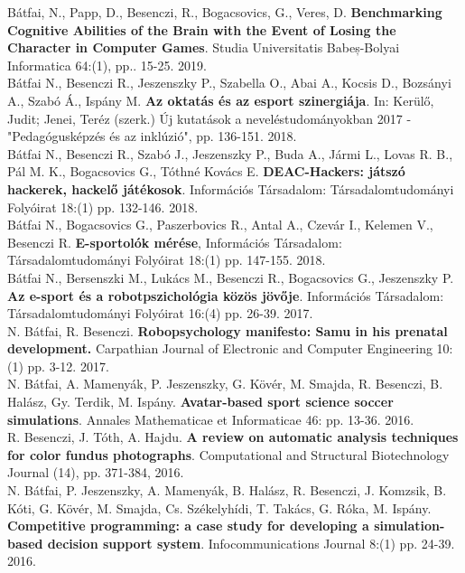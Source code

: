 \documentclass[b5paper,12pt]{report}
\theoremstyle{definition}
\begin{document}
\begin{singlespace}
\noindent
Bátfai, N., Papp, D., Besenczi, R., Bogacsovics, G., Veres, D. {\bf{Benchmarking Cognitive Abilities of the Brain with the Event of Losing the Character in Computer Games}}.
Studia Universitatis Babeș-Bolyai Informatica 64:(1), pp.. 15-25. 2019.
\\[10pt]
\noindent
Bátfai N., Besenczi R., Jeszenszky P., Szabella O., Abai A., Kocsis D., Bozsányi A., Szabó Á., Ispány M. {\bf{Az oktatás és az esport szinergiája}}. In: Kerülő, Judit; Jenei, Teréz (szerk.) Új kutatások a neveléstudományokban 2017 - "Pedagógusképzés és az inklúzió", pp. 136-151. 2018.
\\[10pt]
\noindent
Bátfai N., Besenczi R., Szabó J., Jeszenszky P., Buda A., Jármi L., Lovas R. B., Pál M. K., Bogacsovics G., Tóthné Kovács E. {\bf{DEAC-Hackers: játszó hackerek, hackelő játékosok}}. Információs Társadalom: Társadalomtudományi Folyóirat 18:(1) pp. 132-146. 2018.
\\[10pt]
\noindent
Bátfai N., Bogacsovics G., Paszerbovics R., Antal A., Czevár I., Kelemen V., Besenczi R. {\bf{E-sportolók mérése}}, Információs Társadalom: Társadalomtudományi Folyóirat 18:(1) pp. 147-155. 2018.
\\[10pt]
\noindent
Bátfai N., Bersenszki M., Lukács M., Besenczi R., Bogacsovics G., Jeszenszky P. {\bf{Az e-sport és a robotpszichológia közös jövője}}. Információs Társadalom: Társadalomtudományi Folyóirat 16:(4) pp. 26-39. 2017.
\\[10pt]
\noindent
N. Bátfai, R. Besenczi. {\bf{Robopsychology manifesto: Samu in his prenatal development.}} Carpathian Journal of Electronic and Computer Engineering 10:(1) pp. 3-12. 2017.
\\[10pt]
\noindent
N. Bátfai, A. Mamenyák, P. Jeszenszky, G. Kövér, M. Smajda, R. Besenczi, B. Halász, Gy. Terdik, M. Ispány. {\bf{Avatar-based sport science soccer simulations}}. Annales Mathematicae et Informaticae 46: pp. 13-36. 2016.
\\[10pt]
\noindent
R. Besenczi, J. Tóth, A. Hajdu. {\bf{A review on automatic analysis techniques for color fundus photographs}}. Computational and Structural Biotechnology Journal (14), pp. 371-384, 2016.
\\[10pt]
\noindent
N. Bátfai, P. Jeszenszky, A. Mamenyák, B. Halász, R. Besenczi, J. Komzsik, B. Kóti, G. Kövér, M. Smajda, Cs. Székelyhídi, T. Takács, G. Róka, M. Ispány. {\bf{Competitive programming: a case study for developing a simulation-based decision support system}}. Infocommunications Journal 8:(1) pp. 24-39. 2016.
\\[10pt]

\end{singlespace}
\end{document}
